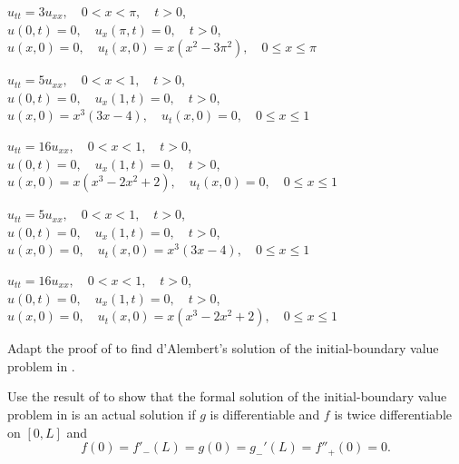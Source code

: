 \begin{exerciselist}
\item\label{exer:12.2.42}$u_{tt}=3u_{xx},\quad 0<x<\pi,\quad t>0$,\\
$u(0,t)=0,\quad u_x(\pi,t)=0,\quad t>0$,\\
$u(x,0)=0,\quad u_t(x,0)=x(x^2-3\pi^2),\quad0\le x\le\pi$


\item\label{exer:12.2.43}$u_{tt}=5u_{xx},\quad 0<x<1,\quad t>0$,\\
$u(0,t)=0,\quad u_x(1,t)=0,\quad t>0$,\\
$u(x,0)=x^3(3x-4),\quad u_t(x,0)=0,\quad0\le x\le1$


\item\label{exer:12.2.44}\Cex
$u_{tt}=16u_{xx},\quad 0<x<1,\quad t>0$,\\
$u(0,t)=0,\quad u_x(1,t)=0,\quad t>0$,\\
$u(x,0)=x(x^3-2x^2+2),\quad u_t(x,0)=0,\quad0\le x\le1$

\item\label{exer:12.2.45}$u_{tt}=5u_{xx},\quad 0<x<1,\quad t>0$,\\
$u(0,t)=0,\quad u_x(1,t)=0,\quad t>0$,\\
$u(x,0)=0,\quad u_t(x,0)=x^3(3x-4),\quad0\le x\le1$



\item\label{exer:12.2.46}\Cex
$u_{tt}=16u_{xx},\quad 0<x<1,\quad t>0$,\\
$u(0,t)=0,\quad u_x(1,t)=0,\quad t>0$,\\
$u(x,0)=0,\quad u_t(x,0)=x(x^3-2x^2+2),\quad0\le x\le1$


\item\label{exer:12.2.47}Adapt the proof of 
to find d'Alembert's solution of the initial-boundary value problem
in .

\item\label{exer:12.2.48}Use the result of  to show that the formal
solution of the initial-boundary value problem in
is an actual solution if $g$ is differentiable and $f$ is twice
differentiable on $[0,L]$ and
\[
f(0)=f'_-(L)=g(0)=g_-'(L)=f''_+(0)=0.
\]


\end{exerciselist}
